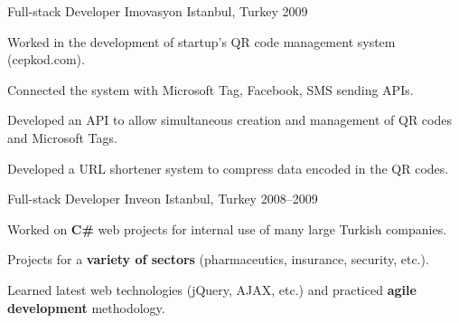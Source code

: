 \begin{cventries}
  \cventry
    {Full-stack Developer} %
    {Imovasyon} %
    {Istanbul, Turkey} %
    {2009} %
    {
      \begin{cvitems} %
        \item {Worked in the development of startup's QR code management system (cepkod.com).}
        \item {Connected the system with Microsoft Tag, Facebook, SMS sending APIs.}
        \item {Developed an API to allow simultaneous creation and management of QR codes and Microsoft Tags.}
        \item {Developed a URL shortener system to compress data encoded in the QR codes.}
      \end{cvitems}
    }

  \cventry
    {Full-stack Developer} %
    {Inveon} %
    {Istanbul, Turkey} %
    {2008--2009} %
    {
      \begin{cvitems} %
        \item {Worked on \textbf{C\#} web projects for internal use of many large Turkish companies.}
        \item {Projects for a \textbf{variety of sectors} (pharmaceutics, insurance, security, etc.).}
        \item {Learned latest web technologies (jQuery, AJAX, etc.) and practiced \textbf{agile development} methodology.}
      \end{cvitems}
    }

\end{cventries}
